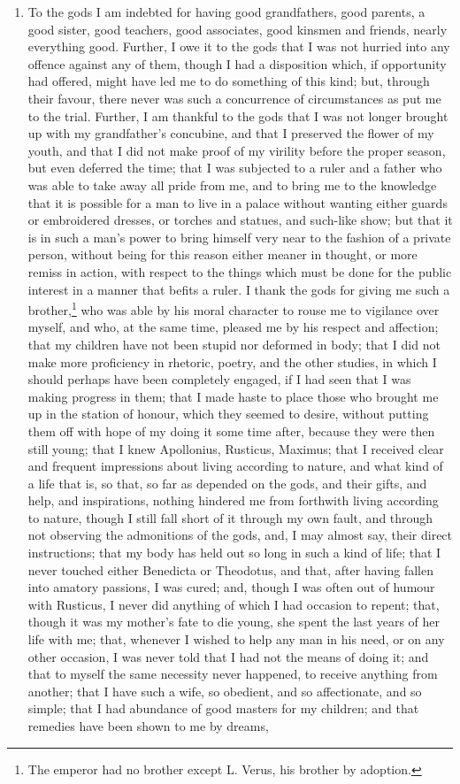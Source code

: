 \begin{enumerate}
\item To the gods I am indebted for having good grandfathers, good parents, a good sister, good teachers, good associates, good kinsmen and friends, nearly everything good. Further, I owe it to the gods that I was not hurried into any offence against any of them, though I had a disposition which, if opportunity had offered, might have led me to do something of this kind; but, through their favour, there never was such a concurrence of circumstances as put me to the trial. Further, I am thankful to the gods that I was not longer brought up with my grandfather's concubine, and that I preserved the flower of my youth, and that I did not make proof of my virility before the proper season, but even deferred the time; that I was subjected to a ruler and a father who was able to take away all pride from me, and to bring me to the knowledge that it is possible for a man to live in a palace without wanting either guards or embroidered dresses, or torches and statues, and such-like show; but that it is in such a man's power to bring himself very near to the fashion of a private person, without being for this reason either meaner in thought, or more remiss in action, with respect to the things which must be done for the public interest in a manner that befits a ruler. I thank the gods for giving me such a brother,\footnote{The emperor had no brother except L. Verus, his brother by adoption.} who was able by his moral character to rouse me to vigilance over myself, and who, at the same time, pleased me by his respect and affection; that my children have not been stupid nor deformed in body; that I did not make more proficiency in rhetoric, poetry, and the other studies, in which I should perhaps have been completely engaged, if I had seen that I was making progress in them; that I made haste to place those who brought me up in the station of honour, which they seemed to desire, without putting them off with hope of my doing it some time after, because they were then still young; that I knew Apollonius, Rusticus, Maximus; that I received clear and frequent impressions about living according to nature, and what kind of a life that is, so that, so far as depended on the gods, and their gifts, and help, and inspirations, nothing hindered me from forthwith living according to nature, though I still fall short of it through my own fault, and through not observing the admonitions of the gods, and, I may almost say, their direct instructions; that my body has held out so long in such a kind of life; that I never touched either Benedicta or Theodotus, and that, after having fallen into amatory passions, I was cured; and, though I was often out of humour with Rusticus, I never did anything of which I had occasion to repent; that, though it was my mother's fate to die young, she spent the last years of her life with me; that, whenever I wished to help any man in his need, or on any other occasion, I was never told that I had not the means of doing it; and that to myself the same necessity never happened, to receive anything from another; that I have such a wife, so obedient, and so affectionate, and so simple; that I had abundance of good masters for my children; and that remedies have been shown to me by dreams, 
\end{enumerate}
